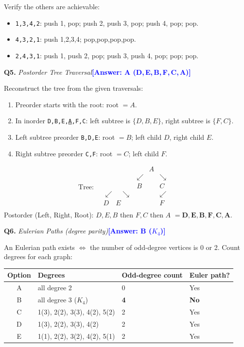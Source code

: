 \documentclass[a4paper,12pt]{article}
\newcommand{\ans}[1]{\textcolor{blue}{\textbf{[Answer: #1]}}}
\newcommand{\qsol}[3]{%
  \vspace{1.5ex}%
  \noindent\textbf{Q#1.} \textit{#2}\quad\ans{#3}%
  \par\vspace{0.4ex}%
}
\begin{document}
Verify the others are achievable:
\begin{itemize}[nosep]
  \item \texttt{1,3,4,2}: push 1, pop; push 2, push 3, pop; push 4, pop; pop.
  \item \texttt{4,3,2,1}: push 1,2,3,4; pop,pop,pop,pop.
  \item \texttt{2,4,3,1}: push 1, push 2, pop; push 3, push 4, pop; pop; pop.
\end{itemize}

\qsol{5}{Postorder Tree Traversal}{A (D,\,E,\,B,\,F,\,C,\,A)}

Reconstruct the tree from the given traversals:
\begin{enumerate}[nosep]
  \item Preorder starts with the root: root $= A$.
  \item In inorder \texttt{D,B,E,\underline{A},F,C}: left subtree is
        $\{D,B,E\}$, right subtree is $\{F,C\}$.
  \item Left subtree preorder \texttt{B,D,E}: root $= B$; left child $D$,
        right child $E$.
  \item Right subtree preorder \texttt{C,F}: root $= C$; left child $F$.
\end{enumerate}
\[
\text{Tree:}\quad
\begin{array}{ccccc}
  & & A & & \\
  & \swarrow & & \searrow & \\
  & B & & C & \\
  \swarrow\quad\searrow & & & \swarrow & \\
  D \quad E & & & F & \\
\end{array}
\]
Postorder (Left, Right, Root): $D, E, B$ then $F, C$ then $A$
$= \mathbf{D, E, B, F, C, A}$.

\qsol{6}{Eulerian Paths (degree parity)}{B ($K_4$)}

An Eulerian path exists $\Leftrightarrow$ the number of odd-degree vertices
is 0 or 2. Count degrees for each graph:

\begin{center}
\begin{tabular}{clll}
  \toprule
  Option & Degrees & Odd-degree count & Euler path? \\
  \midrule
  A & all degree 2 & 0 & Yes \\
  B & all degree 3 ($K_4$) & \textbf{4} & \textbf{No} \\
  C & 1(3), 2(2), 3(3), 4(2), 5(2) & 2 & Yes \\
  D & 1(3), 2(2), 3(3), 4(2) & 2 & Yes \\
  E & 1(1), 2(2), 3(2), 4(2), 5(1) & 2 & Yes \\
  \bottomrule
\end{tabular}
\end{center}
\end{document}

